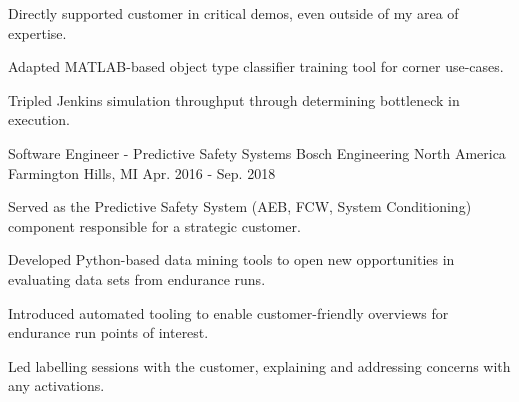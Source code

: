 \begin{cventries}
{\begin{cvitems}
          \item {Directly supported customer in critical demos, even outside of my area of expertise.}
          \item {Adapted MATLAB-based object type classifier training tool for corner use-cases.}
          \item {Tripled Jenkins simulation throughput through determining bottleneck in execution.}
        \fi
      \end{cvitems}
    }

  \cventry
    {Software Engineer - Predictive Safety Systems} %
    {Bosch Engineering North America} %
    {Farmington Hills, MI} %
    {Apr. 2016 - Sep. 2018} %
    {
      \begin{cvitems} %
        \item {Served as the Predictive Safety System (AEB, FCW, System Conditioning) component responsible for a strategic customer.}
        \item {Developed Python-based data mining tools to open new opportunities in evaluating data sets from endurance runs.}
        \item {Introduced automated tooling to enable customer-friendly overviews for endurance run points of interest.}
        \item {Led labelling sessions with the customer, explaining and addressing concerns with any activations.}
      \end{cvitems}
    }


\end{cventries}
